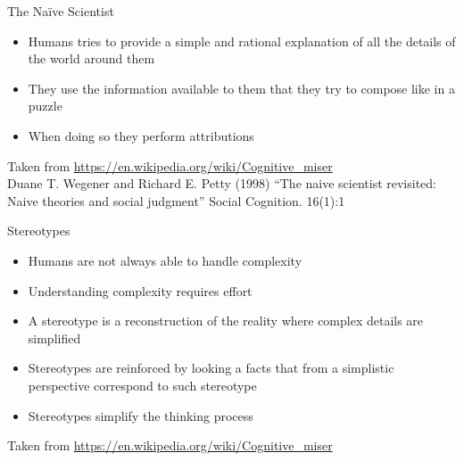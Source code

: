 \documentclass{beamer}
\begin{document}
\begin{frame}
{\centerline{The Na\"{i}ve Scientist}}
\begin{itemize}
    \item Humans tries to provide a simple and rational explanation of all the details of the world around them
    \item They use the information available to them that they try to compose like in a puzzle
    \item When doing so they perform attributions
\end{itemize} 
\begin{center}
    \tiny{Taken from \url{https://en.wikipedia.org/wiki/Cognitive_miser}\\
    Duane T. Wegener and Richard E. Petty (1998) ``The naive scientist revisited: Naive theories and social judgment'' Social Cognition. 16(1):1}
\end{center}

\end{frame}

\begin{frame}
{\centerline{Stereotypes}}
\begin{itemize}
    \item Humans are not always able to handle complexity
    \item Understanding complexity requires effort
    \item A stereotype is a reconstruction of the reality where complex details are simplified
    \item Stereotypes are reinforced by looking a facts that from a simplistic perspective correspond to such stereotype
    \item Stereotypes simplify the thinking process
\end{itemize} 
\begin{center}
    \tiny{Taken from \url{https://en.wikipedia.org/wiki/Cognitive_miser}}
\end{center}

\end{frame}
\end{document}
